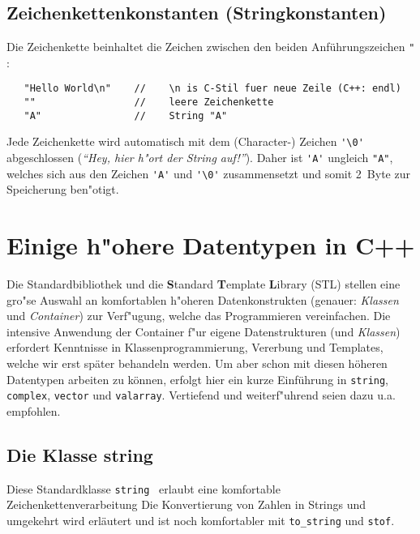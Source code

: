 \subsection{Zeichenkettenkonstanten (Stringkonstanten)}
\label{p:2.22.4}
%
Die Zeichenkette beinhaltet die Zeichen zwischen den beiden
Anführungszeichen \texttt{"} :
\begin{minipage}[t] {0.8\textwidth}
\begin{verbatim}
   "Hello World\n"    //    \n is C-Stil fuer neue Zeile (C++: endl)
   ""                 //    leere Zeichenkette
   "A"                //    String "A"
\end{verbatim}
\end{minipage}

Jede Zeichenkette wird automatisch mit dem
(Character-) Zeichen \verb|'\0'| abgeschlossen
(\textit{``Hey, hier h"ort der String auf!''}).
Daher ist \verb|'A'| ungleich \verb|"A"|, welches
sich aus den Zeichen  \verb|'A'| und \verb|'\0'|
zusammensetzt und somit 2~Byte zur Speicherung ben"otigt.
%
%
%
\section{Einige h"ohere Datentypen in C++}
\label{p:2.3}
%
Die Standardbibliothek und
die \textbf{S}tandard \textbf{T}emplate \textbf{L}ibrary (STL) stellen eine gro"se Auswahl
an komfortablen h"oheren Datenkonstrukten (genauer: \emph{Klassen} und \emph{Container}) zur Verf"ugung, welche
das Programmieren vereinfachen.
Die intensive Anwendung der Container f"ur eigene Datenstrukturen (und \emph{Klassen})
erfordert Kenntnisse in Klassenprogrammierung, Vererbung und  Templates, welche wir erst später behandeln werden.
Um aber schon mit diesen höheren Datentypen arbeiten zu können,  erfolgt hier ein kurze Einführung
in \texttt{string}, \texttt{complex},
\texttt{vector} und \texttt{valarray}.
Vertiefend und weiterf"uhrend seien dazu u.a.
\cite{KirchPrinz:2002:OOP, KuhlinsSchader:2002:DCS, SatirBrown:1995:PCP}
empfohlen.
%

\subsection{Die Klasse string}
\label{p:2.3.1}
Diese Standardklasse \texttt{string}~\cite[\S~18]{KirchPrinz:2002:OOP}
erlaubt eine komfortable Zeichenkettenverarbeitung
%
Die Konvertierung von Zahlen in Strings und umgekehrt wird  erläutert und ist noch komfortabler mit
  \texttt{to\_string} und \texttt{stof}.
%

